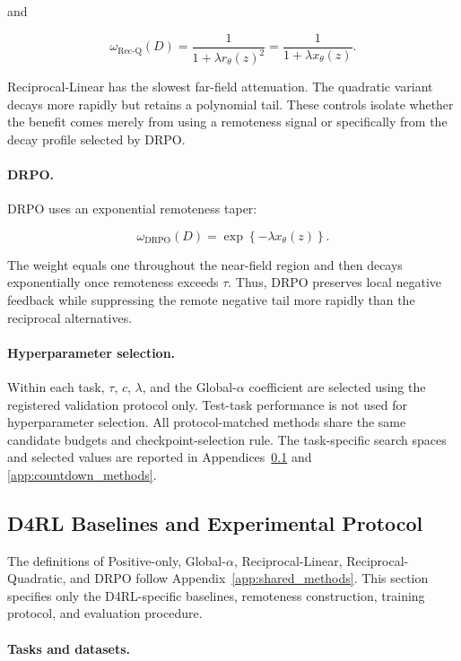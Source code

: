 and

\[
\omega_{\mathrm{Rec\text{-}Q}}(D)
=
\frac{1}{1+\lambda r_\theta(z)^2}
=
\frac{1}{1+\lambda x_\theta(z)}.
\]

Reciprocal-Linear has the slowest far-field attenuation. The quadratic
variant decays more rapidly but retains a polynomial tail. These
controls isolate whether the benefit comes merely from using a
remoteness signal or specifically from the decay profile selected by
DRPO.

\paragraph{DRPO.}

DRPO uses an exponential remoteness taper:

\[
\omega_{\mathrm{DRPO}}(D)
=
\exp\left\{
-\lambda x_\theta(z)
\right\}.
\]

The weight equals one throughout the near-field region and then decays
exponentially once remoteness exceeds \(\tau\). Thus, DRPO preserves
local negative feedback while suppressing the remote negative tail more
rapidly than the reciprocal alternatives.

\paragraph{Hyperparameter selection.}

Within each task, \(\tau\), \(c\), \(\lambda\), and the
Global-\(\alpha\) coefficient are selected using the registered
validation protocol only. Test-task performance is not used for
hyperparameter selection. All protocol-matched methods share the same
candidate budgets and checkpoint-selection rule. The task-specific
search spaces and selected values are reported in
Appendices~\ref{app:d4rl_methods} and
\ref{app:countdown_methods}.


\subsection{D4RL Baselines and Experimental Protocol}
\label{app:d4rl_methods}

The definitions of Positive-only, Global-\(\alpha\),
Reciprocal-Linear, Reciprocal-Quadratic, and DRPO follow
Appendix~\ref{app:shared_methods}. This section specifies only the
D4RL-specific baselines, remoteness construction, training protocol,
and evaluation procedure.

\paragraph{Tasks and datasets.}

